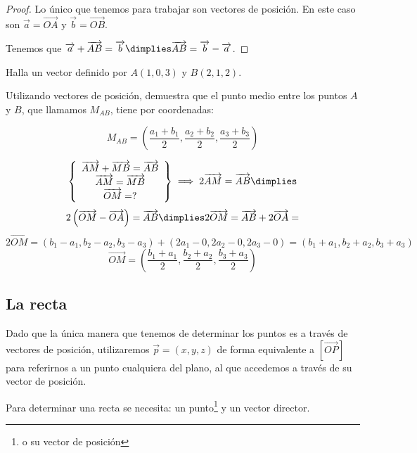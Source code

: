 \begin{proof}
Lo único que tenemos para trabajar son vectores de posición. 
%
En este caso son $\vec{a} = \vec{OA}$ y $\vec{b} = \vec{OB}$. 

Tenemos que $\vec{a} + \vec{AB} = \vec{b} \dimplies \vec{AB} = \vec{b}-\vec{a}$.
\end{proof}

\begin{example}
    Halla un vector definido por $A(1,0,3)$ y $B(2,1,2)$.
    
    \hide{\[\vec{AB} = (2-1, 1-0, 2-3) = (1,1,-1)\]}
\end{example}

\begin{problem}

Utilizando vectores de posición, demuestra que el punto medio entre los puntos $A$ y $B$, que llamamos $M_{AB}$, tiene por coordenadas:

\[M_{AB} = \left(\frac{a_1+b_1}{2},\frac{a_2+b_2}{2},\frac{a_3+b_3}{2}\right)\]


\solution

\[
\left\{
\begin{array}{c}
    \vec{AM} + \vec{MB} = \vec{AB}\\
    \vec{AM} = \vec{MB}\\
    \vec{OM} = ?
\end{array}\right\}
 \implies 
  2\vec{AM} = \vec{AB} \dimplies
  \]\[ 
  2\left(\vec{OM} - \vec{OA}\right) = \vec{AB} \dimplies
  2\vec{OM} = \vec{AB} + 2\vec{OA} = 
  \]\[
  2\vec{OM} = \left(
  b_1-a_1,
  b_2-a_2,
  b_3-a_3
  \right) + 
  \left(
  2a_1 - 0,
  2a_2 - 0,
  2a_3 - 0
  \right) = 
  \left(
  b_1+a_1,
  b_2+a_2,
  b_3+a_3
  \right)\]\[
  \vec{OM} = \left(
  \frac{b_1+a_1}{2},
  \frac{b_2+a_2}{2},
  \frac{b_3+a_3}{2}
  \right)
\]

\end{problem}

\subsection{La recta}

\obs Dado que la única manera que tenemos de determinar los puntos es a través de vectores de posición, utilizaremos $\vec{p} = (x,y,z)$ de forma equivalente a $[\vec{OP}]$ para referirnos a un punto cualquiera del plano, al que accedemos a través de su vector de posición.

Para determinar una recta se necesita: un punto\footnote{o su vector de posición} y un vector director. 

